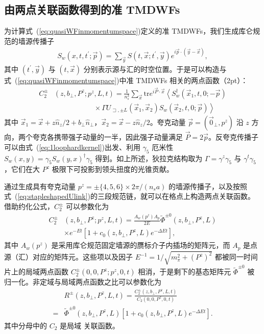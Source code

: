 \subsection{由两点关联函数得到的准 TMDWFs}
\label{sec:quasi-WF_from_2pt}
为计算式~(\ref{eq:quasiWFinmomentumspace})定义的准 TMDWFs，我们生成库仑规范的墙源传播子
\begin{align}
S_{w}\left(x, t, t^{\prime} ; \vec{p}\right)=\sum_{\vec{y}} S\left(t, \vec{x} ; t^{\prime}, \vec{y}\right) e^{i \vec{p} \cdot(\vec{y}-\vec{x})}, \label{eq:wallsource}
\end{align}
其中 $(t^{\prime},\vec{y})$ 与 $(t,\vec{x})$ 分别表示源与汇的时空位置。于是可以构造与式~(\ref{eq:quasiWFinmomentumspace})中准 TMDWFs 相关的两点函数（2pt）：
\begin{align}
C_2^{\pm}&	\left(z,b_{\perp},P^z; p^z,L,t \right)=\frac{1}{n_s^3}\sum_{\vec{x}}\mathrm{tr} e^{i\vec{P}\cdot\vec{x}}\left\langle S_w^{\dagger}\left(\vec{x}_1,t,0;-\vec{p}\right)\right. \nonumber\\
&\;\;\;\;\;\;\;\;\;\; \;\;\;\;\;\;\;\;\;\;    \times \left. \Gamma U_{\sqsupset, \pm L}\left(\vec{x}_1,\vec{x}_2\right) S_w\left(\vec{x}_2,t,0;\vec{p} \right)  \right\rangle
\label{eq:nonlocal2pt}
\end{align}
其中 $\vec{x}_1=\vec{x}+z\hat{n}_z/2+b_{\perp}\hat{n}_{\perp}$，$\vec{x}_2=\vec{x}-z \hat{n}_{z}/2$。夸克动量 $\vec{p}=(\vec{0}_{\perp},p^z)$ 沿 $z$ 方向，两个夸克各携带强子动量的一半，因此强子动量满足 $\vec{P}=2\vec{p}$。反夸克传播子可以由式~(\ref{eq:1loophardkernel})出发、利用 $\gamma_5$ 厄米性 $S_w(x,y)=\gamma_5S_w(y,x)^{\dagger}\gamma_5$ 得到。如上所述，狄拉克结构取为 $\Gamma=\gamma^z\gamma_5$ 与 $\gamma^t\gamma_5$，它们在大 $P^z$ 极限下可投影到领头扭度的光锥贡献。

通过生成具有夸克动量 $p^z=\pm\{4,5,6\}\times2\pi/(n_sa)$ 的墙源传播子，以及按照式~(\ref{eq:stapleshapedUlink})的三段规范链，就可以在格点上构造两点关联函数。借助约化公式，$C_2^{\pm}$ 可以参数化为
 \begin{align}
C_2^{\pm}&\left(z,b_{\perp},P^z; p^z,L,t \right)=\frac{A_w(p^z)A_p}{2E}\tilde{\Phi}^{\pm0}\left(z,b_{\perp},P^z,L\right) \nonumber\\
& \times e^{-Et}\left[1+c_0\left(z,b_{\perp},P^z,L\right)e^{-\Delta Et} \right], \label{eq:C2parametrization}
 \end{align}
其中 $A_w(p^z)$ 是采用库仑规范固定墙源的赝标介子内插场的矩阵元，而 $A_p$ 是点源（汇）对应的矩阵元。这些项以及因子 $E^{-1}=1/\sqrt{m_{\pi}^2+\left(P^z\right)^2}$ 都被同一时间片上的局域两点函数 $C_2^{\pm}\left(0,0,P^z; p^z,0,t \right)$ 相消，于是剩下的基态矩阵元 $\tilde{\Phi}^{\pm0}$ 被归一化。非定域与局域两点函数之比可以参数化为
\begin{align}
&R^{\pm}\left(z,b_{\perp},P^z,L,t \right)=\frac{C_2^{\pm}\left(z,b_{\perp},P^z,L,t \right)}{C_2\left(0,0,P^z,0,t \right)} \nonumber\\
=&\tilde{\Phi}^{\pm0}\left(z,b_{\perp},P^z,L\right)\left[1+c_0\left(z,b_{\perp},P^z,L\right)e^{-\Delta Et} \right].
\label{eq:two-state-fit}
\end{align}
其中分母中的 $C_2$ 是局域
关联函数。

